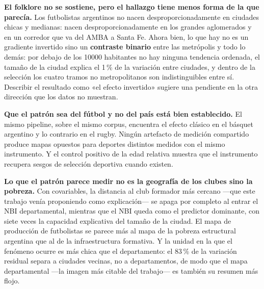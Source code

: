 \documentclass[11pt,a4paper]{article}
\begin{document}
\textbf{El folklore no se sostiene, pero el hallazgo tiene menos forma de la que
parecía.} Los futbolistas argentinos no nacen desproporcionadamente en ciudades
chicas y medianas: nacen desproporcionadamente en los grandes aglomerados y en un
corredor que va del AMBA a Santa Fe. Ahora bien, lo que hay no es un gradiente
invertido sino un \textbf{contraste binario} entre las metrópolis y todo lo
demás: por debajo de los \num{10000} habitantes no hay ninguna tendencia
ordenada, el tamaño de la ciudad explica el 1\,\% de la variación entre ciudades,
y dentro de la selección los cuatro tramos no metropolitanos son indistinguibles
entre sí. Describir el resultado como «el efecto invertido» sugiere una pendiente
en la otra dirección que los datos no muestran.

\textbf{Que el patrón sea del fútbol y no del país está bien establecido.} El mismo
pipeline, sobre el mismo corpus, encuentra el efecto clásico en el básquet
argentino y lo contrario en el rugby. Ningún artefacto de medición compartido
produce mapas opuestos para deportes distintos medidos con el mismo instrumento.
Y el control positivo de la edad relativa muestra que el instrumento recupera
sesgos de selección deportiva cuando existen.

\textbf{Lo que el patrón parece medir no es la geografía de los clubes sino la
pobreza.} Con covariables, la distancia al club formador más cercano —que este
trabajo venía proponiendo como explicación— se apaga por completo al entrar el
NBI departamental, mientras que el NBI queda como el predictor dominante, con
siete veces la capacidad explicativa del tamaño de la ciudad. El mapa de
producción de futbolistas se parece más al mapa de la pobreza estructural
argentina que al de la infraestructura formativa. Y la unidad en la que el
fenómeno ocurre es más chica que el departamento: el 83\,\% de la variación
residual separa a ciudades vecinas, no a departamentos, de modo que el mapa
departamental —la imagen más citable del trabajo— es también su resumen más
flojo.
\end{document}
